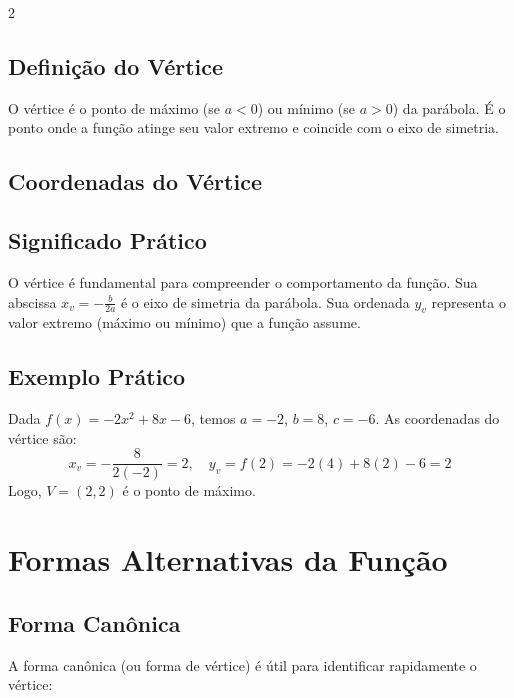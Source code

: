 \documentclass[11pt]{article}
\begin{document}
\begin{multicols}{2}
\subsection*{Definição do Vértice}
O vértice é o ponto de máximo (se $a < 0$) ou mínimo (se $a > 0$) da parábola. É o ponto onde a função atinge seu valor extremo e coincide com o eixo de simetria.

\subsection*{Coordenadas do Vértice}

\subsection*{Significado Prático}
O vértice é fundamental para compreender o comportamento da função. Sua abscissa $x_v = -\frac{b}{2a}$ é o eixo de simetria da parábola. Sua ordenada $y_v$ representa o valor extremo (máximo ou mínimo) que a função assume.

\subsection*{Exemplo Prático}
Dada $f(x) = -2x^2 + 8x - 6$, temos $a = -2$, $b = 8$, $c = -6$. As coordenadas do vértice são:
\[
x_v = -\frac{8}{2(-2)} = 2, \quad y_v = f(2) = -2(4) + 8(2) - 6 = 2
\]
Logo, $V = (2, 2)$ é o ponto de máximo.

\section*{Formas Alternativas da Função}

\subsection*{Forma Canônica}
A forma canônica (ou forma de vértice) é útil para identificar rapidamente o vértice:


\end{multicols}
\end{document}
